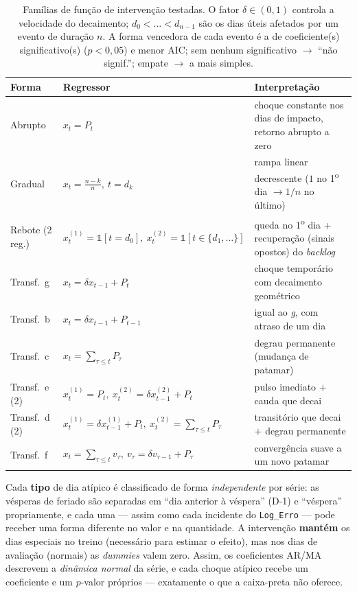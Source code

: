 \documentclass[11pt,a4paper]{article}
\begin{document}
\begin{table}[H]
\centering
\caption{Famílias de função de intervenção testadas. O fator $\delta \in (0,1)$ controla a
velocidade do decaimento; $d_0<\dots<d_{n-1}$ são os dias úteis afetados por um evento de duração
$n$. A forma vencedora de cada evento é a de coeficiente(s) significativo(s) ($p<0{,}05$) e menor
AIC; sem nenhum significativo $\to$ ``não signif.''; empate $\to$ a mais simples.}
\label{tab:transfer}
\small
\renewcommand{\arraystretch}{1.45}
\begin{tabular}{@{}llp{5.2cm}@{}}
\toprule
\textbf{Forma} & \textbf{Regressor} & \textbf{Interpretação} \\
\midrule
Abrupto        & $x_t = P_t$ & choque constante nos dias de impacto, retorno abrupto a zero \\
Gradual        & $x_t = \tfrac{n-k}{n},\ t=d_k$ & rampa linear decrescente ($1$ no 1\textsuperscript{o} dia $\to 1/n$ no último) \\
Rebote (2 reg.)& $x^{(1)}_t=\mathbb{1}[t=d_0],\ x^{(2)}_t=\mathbb{1}[t\in\{d_1,\dots\}]$ & queda no 1\textsuperscript{o} dia + recuperação (sinais opostos) do \emph{backlog} \\
Transf.\ g     & $x_t=\delta x_{t-1}+P_t$ & choque temporário com decaimento geométrico \\
Transf.\ b     & $x_t=\delta x_{t-1}+P_{t-1}$ & igual ao \emph{g}, com atraso de um dia \\
Transf.\ c     & $x_t=\sum_{\tau\le t}P_\tau$ & degrau permanente (mudança de patamar) \\
Transf.\ e (2) & $x^{(1)}_t=P_t,\ x^{(2)}_t=\delta x^{(2)}_{t-1}+P_t$ & pulso imediato $+$ cauda que decai \\
Transf.\ d (2) & $x^{(1)}_t=\delta x^{(1)}_{t-1}+P_t,\ x^{(2)}_t=\sum_{\tau\le t}P_\tau$ & transitório que decai $+$ degrau permanente \\
Transf.\ f     & $x_t=\sum_{\tau\le t}v_\tau,\ v_\tau=\delta v_{\tau-1}+P_\tau$ & convergência suave a um novo patamar \\
\bottomrule
\end{tabular}
\end{table}

\noindent
Cada \textbf{tipo} de dia atípico é classificado de forma \emph{independente} por série: as
vésperas de feriado são separadas em ``dia anterior à véspera'' (D-1) e ``véspera'' propriamente, e
cada uma --- assim como cada incidente do \texttt{Log\_Erro} --- pode receber uma forma diferente
no valor e na quantidade. A intervenção \textbf{mantém} os dias especiais no treino (necessário
para estimar o efeito), mas nos dias de avaliação (normais) as \emph{dummies} valem zero. Assim,
os coeficientes AR/MA descrevem a \emph{dinâmica normal} da série, e cada choque atípico recebe um
coeficiente e um $p$-valor próprios --- exatamente o que a caixa-preta não oferece.
\end{document}
